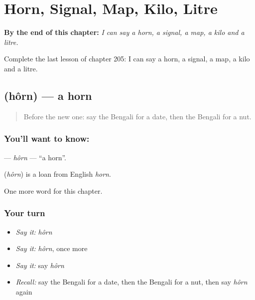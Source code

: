 
\chapter{Horn, Signal, Map, Kilo, Litre}
\label{ch:bn-horn-signal-map-kilo-litre}

\begin{chapteropening}
\textbf{By the end of this chapter:} \emph{I can say a horn, a signal, a map, a kilo and a litre.}

Complete the last lesson of chapter 205: I can say a horn, a signal, a map, a kilo and a litre.
\end{chapteropening}

\section[\texorpdfstring{\bn{হর্ন} (hôrn)}{হর্ন (hôrn)}]{ (hôrn) — a horn}

\label{lesson:BN-C205-horn}



\begin{quote}
Before the new one: say the Bengali for a date, then the Bengali for a nut.
\end{quote}

\subsection*{You'll want to know: }
\textbf{} — \emph{hôrn} — \textquotedblleft{}a horn\textquotedblright{}.

\begin{cousinweb}
\textbf{} (\emph{hôrn}) is a loan from English \emph{horn}.
\end{cousinweb}

\begin{grammarlens}[title={What you've built}]
One more word for this chapter.
\end{grammarlens}

\subsection*{Your turn}
\begin{itemize}
\raggedright
  \item \emph{Say it:} \emph{hôrn}
  \item \emph{Say it:} \emph{hôrn}, once more
  \item \emph{Say it:} say \emph{hôrn}
  \item \emph{Recall:} say the Bengali for a date, then the Bengali for a nut, then say \emph{hôrn} again
\end{itemize}


